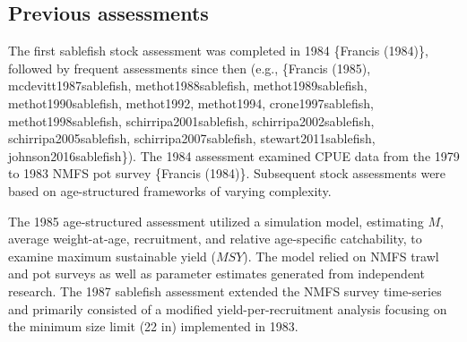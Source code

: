 \documentclass[11pt,
  english,
  a4paper,
]{article}
\begin{document}
\leavevmode\tagmcend\tagstructend


\hypertarget{previous-assessments}{%
\subsection{Previous assessments}\label{previous-assessments}}

\leavevmode\tagmcend\tagstructend


The first sablefish stock assessment was completed in 1984 \{{Francis (1984)\leavevmode\tagmcend\tagstructend}\}, followed by frequent assessments since then (e.g., \{{Francis (1985)\leavevmode\tagmcend\tagstructend}, mcdevitt1987sablefish, methot1988sablefish, methot1989sablefish, methot1990sablefish, methot1992, methot1994, crone1997sablefish, methot1998sablefish, schirripa2001sablefish, schirripa2002sablefish, schirripa2005sablefish, schirripa2007sablefish, stewart2011sablefish, johnson2016sablefish\}). The 1984 assessment examined CPUE data from the 1979 to 1983 NMFS pot survey \{{Francis (1984)\leavevmode\tagmcend\tagstructend}\}. Subsequent stock assessments were based on age-structured frameworks of varying complexity.

\leavevmode\tagmcend\tagstructend\par


The 1985 age-structured assessment utilized a simulation model, estimating {\(M\)\leavevmode\tagmcend\tagstructend}, average weight-at-age, recruitment, and relative age-specific catchability, to examine maximum sustainable yield ({\(MSY\)\leavevmode\tagmcend\tagstructend}). The model relied on NMFS trawl and pot surveys as well as parameter estimates generated from independent research. The 1987 sablefish assessment extended the NMFS survey time-series and primarily consisted of a modified yield-per-recruitment analysis focusing on the minimum size limit (22 in) implemented in 1983.

\leavevmode\tagmcend\tagstructend\par
\end{document}

